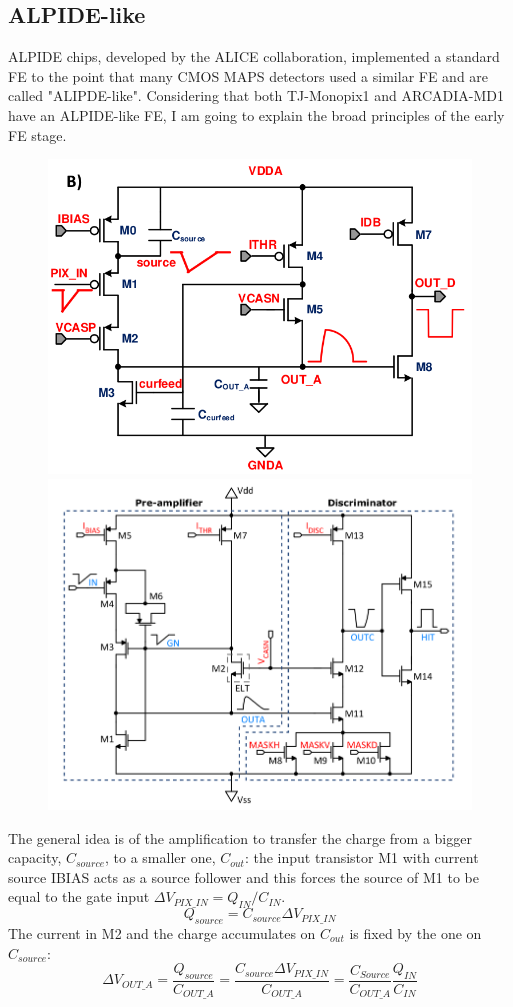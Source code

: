         \subsection{ALPIDE-like}
            ALPIDE chips, developed by the ALICE collaboration, implemented a standard FE to the point that many CMOS MAPS detectors used a similar FE and are called "ALIPDE-like". 
            Considering that both TJ-Monopix1 and ARCADIA-MD1 have an ALPIDE-like FE, I am going to explain the broad principles of the early FE stage.
            \begin{figure}[h!]
                \centering
                \includegraphics[width=.49\linewidth]{figures/Monopix1/ALPIDE_FE.png}
                \includegraphics[width=.49\linewidth]{figures/Monopix1/Monopix1_FE_circuit.png}
                \caption{}
                \label{fig:Monopix1_FE_circuit}
            \end{figure}
            The general idea is of the amplification to transfer the charge from a bigger capacity\cite{ALPIDE-FE}, $C_{source}$, to a smaller one, $C_{out}$: the input transistor M1 with current source IBIAS acts as a source follower and this forces the source of M1 to be equal to the gate input  $\Delta V_{PIX\_IN} = Q_{IN}/C_{IN}$.
            \begin{equation}
                Q_{source} = C_{source} \Delta V_{PIX\_IN}
            \end{equation}
            The current in M2 and the charge accumulates on $C_{out}$ is fixed by the one on $C_{source}$:
            \begin{equation}
                \Delta V_{OUT\_A} = \frac{Q_{source}}{C_{OUT\_A}} = \frac{C_{source}\Delta V_{PIX\_IN}}{C_{OUT\_A}}  = \frac{C_{Source}}{C_{OUT\_A}}\frac{Q_{IN}}{C_{IN}}
            \end{equation}
